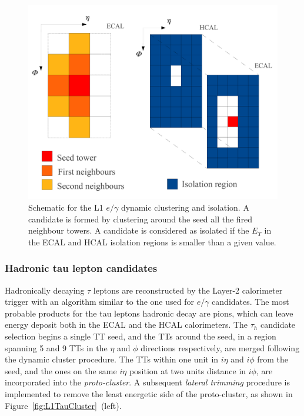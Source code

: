 \begin{figure}
    \centering
    \includegraphics[width=0.5\linewidth]{Figures/L1TP/L1EGammaCluster.pdf}
    \caption{Schematic for the L1 $e/\gamma$ dynamic clustering and isolation. A candidate is formed by clustering around the seed all the fired neighbour towers. A candidate is considered as isolated if the $E_T$ in the ECAL and HCAL isolation regions is smaller than a given value.}
    \label{fig:L1EGammaCluster}
\end{figure}

\subsubsection{Hadronic tau lepton candidates}

Hadronically decaying $\tau$ leptons are reconstructed by the Layer-2 calorimeter trigger with an algorithm similar to the one used for $e/\gamma$ candidates.
The most probable products for the tau leptons hadronic decay are pions, which can leave energy deposit both in the ECAL and the HCAL calorimeters. 
The $\tau_h$ candidate selection begins a single TT seed, and the TTs around the seed, in a region spanning 5 and 9 TTs in the $\eta$ and $\phi$ directions respectively, are merged following the dynamic cluster procedure.
The TTs within one unit in $i\eta$ and $i\phi$ from the seed, and the ones on the same $i\eta$ position at two units distance in $i\phi$, are incorporated into the \textit{proto-cluster}. A subsequent \textit{lateral trimming} procedure is implemented to remove the least energetic side of the proto-cluster, as shown in Figure~\ref{fig:L1TauCluster}~(left).

